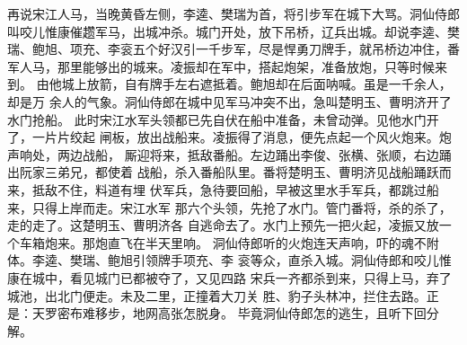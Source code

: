 再说宋江人马，当晚黄昏左侧，李逵、樊瑞为首，将引步军在城下大骂。洞仙侍郎
叫咬儿惟康催趱军马，出城冲杀。城门开处，放下吊桥，辽兵出城。却说李逵、樊
瑞、鲍旭、项充、李衮五个好汉引一千步军，尽是悍勇刀牌手，就吊桥边冲住，番
军人马，那里能够出的城来。凌振却在军中，搭起炮架，准备放炮，只等时候来到。
由他城上放箭，自有牌手左右遮抵着。鲍旭却在后面呐喊。虽是一千余人，却是万
余人的气象。洞仙侍郎在城中见军马冲突不出，急叫楚明玉、曹明济开了水门抢船。
此时宋江水军头领都已先自伏在船中准备，未曾动弹。见他水门开了，一片片绞起
闸板，放出战船来。凌振得了消息，便先点起一个风火炮来。炮声响处，两边战船，
厮迎将来，抵敌番船。左边踊出李俊、张横、张顺，右边踊出阮家三弟兄，都使着
战船，杀入番船队里。番将楚明玉、曹明济见战船踊跃而来，抵敌不住，料道有埋
伏军兵，急待要回船，早被这里水手军兵，都跳过船来，只得上岸而走。宋江水军
那六个头领，先抢了水门。管门番将，杀的杀了，走的走了。这楚明玉、曹明济各
自逃命去了。水门上预先一把火起，凌振又放一个车箱炮来。那炮直飞在半天里响。
洞仙侍郎听的火炮连天声响，吓的魂不附体。李逵、樊瑞、鲍旭引领牌手项充、李
衮等众，直杀入城。洞仙侍郎和咬儿惟康在城中，看见城门已都被夺了，又见四路
宋兵一齐都杀到来，只得上马，弃了城池，出北门便走。未及二里，正撞着大刀关
胜、豹子头林冲，拦住去路。正是：天罗密布难移步，地网高张怎脱身。
毕竟洞仙侍郎怎的逃生，且听下回分解。
